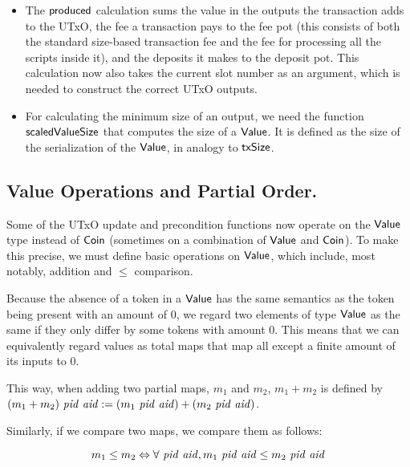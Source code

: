 \begin{itemize}
  \item The $\mathsf{produced}$ calculation sums the value in the outputs the
  transaction adds to the UTxO, the fee a transaction pays
  to the fee pot (this consists of both the standard size-based transaction fee
  and the fee for processing all the scripts inside it),
  and the deposits it makes
  to the deposit pot.
  This calculation now also takes the current slot number as an argument, which is
  needed to construct the correct UTxO outputs.

  \item For calculating the minimum size of an output, we need the
  function $\mathsf{scaledValueSize}$ that computes the size of a
  $\mathsf{Value}$. It is defined as the size of the serialization of the
  $\mathsf{Value}$, in analogy to $\mathsf{txSize}$.
\end{itemize}

\subsection{Value Operations and Partial Order.}
\label{sec:value-ops}
Some of the UTxO update and precondition functions now operate on the $\mathsf{Value}$
type instead of $\mathsf{Coin}$ (sometimes on a combination of $\mathsf{Value}$ and $\mathsf{Coin}$).
To make this precise, we must define basic operations on $\mathsf{Value}$, which
include, most notably, addition and $\leq$ comparison.

Because the absence of a token in a $\mathsf{Value}$ has the same semantics as
the token being present with an amount of $0$, we regard two elements of
type $\mathsf{Value}$ as the same if they only differ by some tokens with
amount $0$. This means that we can equivalently regard values as total
maps that map all except a finite amount of its inputs to $0$.

This way, when adding two partial maps, $m_1$ and $m_2$, $m_1 + m_2$ is defined
by $(m_1 + m_2)~\mathit{pid}~\mathit{aid} := (m_1~\mathit{pid}~\mathit{aid}) + (m_2~\mathit{pid}~\mathit{aid})$.

Similarly, if we compare two maps, we compare them as follows:

\[ m_1 \leq m_2 \Leftrightarrow \forall~\mathit{pid}~\mathit{aid}, m_1~\mathit{pid}~\mathit{aid} \leq m_2~\mathit{pid}~\mathit{aid} \]

